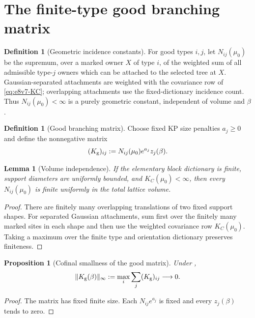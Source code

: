 \documentclass[11pt,oneside]{book}
\newtheorem{lemma}[theorem]{Lemma}
\newtheorem{proposition}[theorem]{Proposition}
\theoremstyle{definition}
\newtheorem{definition}[theorem]{Definition}
\theoremstyle{remark}
\begin{document}
\section{The finite-type good branching matrix}
\label{sec:e8v8-good-matrix}

\begin{definition}[Geometric incidence constants]
\label{def:e8v8-incidence}
For good types \(i,j\), let \(N_{ij}(\mu_0)\) be the supremum, over a
marked owner \(X\) of type \(i\), of the weighted sum of all
admissible type-\(j\) owners which can be attached to the selected
tree at \(X\).  Gaussian-separated attachments are weighted with the
covariance row of \eqref{eq:e8v7-KC}; overlapping attachments use the
fixed-dictionary incidence count.  Thus \(N_{ij}(\mu_0)<\infty\) is
a purely geometric constant, independent of volume and \(\beta\).
\end{definition}

\begin{definition}[Good branching matrix]
\label{def:e8v8-Kg}
Choose fixed KP size penalties \(a_j\ge0\) and define the nonnegative
matrix
\[
 (K_{\rm g})_{ij}
 :=N_{ij}(\mu_0)e^{a_j}z_j(\beta).                  \label{eq:e8v8-Kg}
\]
\end{definition}

\begin{lemma}[Volume independence]
\label{lem:e8v8-volume}
If the elementary block dictionary is finite, support diameters are
uniformly bounded, and \(K_C(\mu_0)<\infty\), then every
\(N_{ij}(\mu_0)\) is finite uniformly in the total lattice volume.
\end{lemma}

\begin{proof}
There are finitely many overlapping translations of two fixed
support shapes.  For separated Gaussian attachments, sum first over
the finitely many marked sites in each shape and then use the
weighted covariance row \(K_C(\mu_0)\).  Taking a maximum over the
finite type and orientation dictionary preserves finiteness.
\end{proof}

\begin{proposition}[Cofinal smallness of the good matrix]
\label{prop:e8v8-Kg-zero}
Under ,
\[
 \|K_{\rm g}(\beta)\|_\infty
 :=\max_i\sum_j(K_{\rm g})_{ij}\longrightarrow0.     \label{eq:e8v8-Kg-zero}
\]
\end{proposition}

\begin{proof}
The matrix has fixed finite size.  Each \(N_{ij}e^{a_j}\) is fixed
and every \(z_j(\beta)\) tends to zero.
\end{proof}
\end{document}
